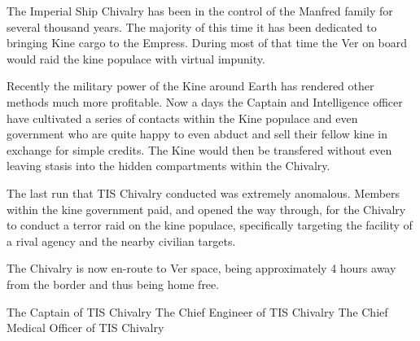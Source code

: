\documentclass[blue]{guildcamp4}
\begin{document}
\name{\bChivalry{}}

The Imperial Ship Chivalry has been in the control of the Manfred family for several thousand years. The majority of this time it has been dedicated to bringing Kine cargo to the Empress. During most of that time the Ver on board would raid the kine populace with virtual impunity.

Recently the military power of the Kine around Earth has rendered other methods much more profitable. Now a days the Captain and Intelligence officer have cultivated a series of contacts within the Kine populace and even government who are quite happy to even abduct and sell their fellow kine in exchange for simple credits. The Kine would then be transfered without even leaving stasis into the hidden compartments within the Chivalry. 

The last run that TIS Chivalry conducted was extremely anomalous. Members within the kine government paid, and opened the way through, for the Chivalry to conduct a terror raid on the kine populace, specifically targeting the facility of a rival agency and the nearby civilian targets. 

The Chivalry is now en-route to Ver space, being approximately 4 hours away from the border and thus being home free.


\begin{members}
	\member{\cVone{}} The Captain of TIS Chivalry
	\member{\cVtwo{}} The Chief Engineer of TIS Chivalry
	\member{\cVthree{}} The Chief Medical Officer of TIS Chivalry
	
\end{members}
\end{document}
